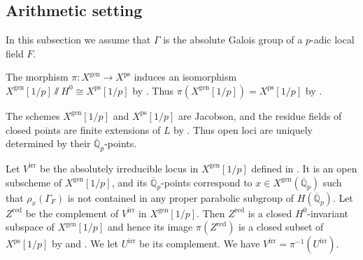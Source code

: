 \documentclass{amsart}
\theoremstyle{definition}
\theoremstyle{remark}
\newcommand{\Qpbar}{\overline{\mathbb{Q}}_p}
\newcommand{\gen}{\mathrm{gen}}
\newcommand{\red}{\mathrm{red}}
\newcommand{\irr}{\mathrm{irr}}
\newcommand{\ps}{\mathrm{ps}}
\begin{document}
\subsection{Arithmetic setting} In this subsection we assume that $\Gamma$ is the absolute Galois group of a $p$-adic local field $F$. 

The morphism $\pi: X^{\gen} \rightarrow X^{\ps}$ induces an isomorphism $X^{\gen}[1/p]\sslash H^0\cong X^{\ps}[1/p]$ by . Thus $\pi(X^{\gen}[1/p])=X^{\ps}[1/p]$ by  \cite[Theorem 3 (ii)]{seshadri}. 

The schemes $X^{\gen}[1/p]$ 
and $X^{\ps}[1/p]$ are Jacobson, and the 
residue fields of closed points are finite 
extensions of $L$ by \cite[Lemmas 3.17, 3.18]{BIP_new}. Thus open loci are uniquely determined by their $\Qpbar$-points. 


Let $V^{\irr}$ be the absolutely irreducible locus in $X^{\gen}[1/p]$ defined in \cite[Definition 9.12]{defG}. It is 
an open subscheme of  $X^{\gen}[1/p]$, 
and its $\Qpbar$-points correspond to 
 $x\in X^{\gen}(\Qpbar)$ such that 
 $\rho_x(\Gamma_F)$ is not contained in
 any proper parabolic  subgroup of $H(\Qpbar)$. Let $Z^{\red}$ be the complement of $V^{\irr}$ in $X^{\gen}[1/p]$. Then 
 $Z^{\red}$ is a closed $H^0$-invariant subspace of
 $X^{\gen}[1/p]$ and hence its image $\pi(Z^{\red})$ is 
 a closed subset of $X^{\ps}[1/p]$ by \cite[Theorem 3]{seshadri} and . We let $U^{\irr}$ be its complement. We have $V^{\irr}=\pi^{-1}(U^{\irr})$.
\end{document}
